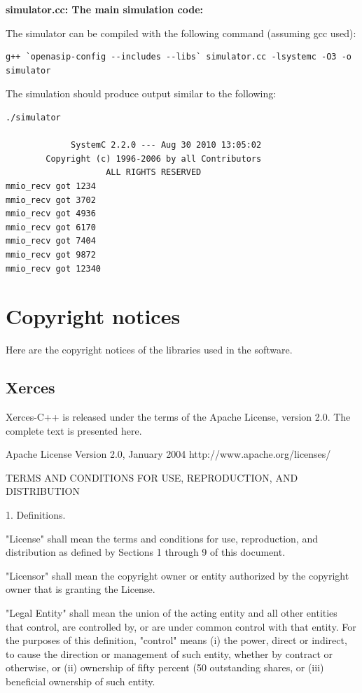 \documentclass[a4paper,twoside]{tceusermanual}
\begin{document}
\textbf{simulator.cc: The main simulation code:}
 


The simulator can be compiled with the following command (assuming gcc
used):

\begin{verbatim}
g++ `openasip-config --includes --libs` simulator.cc -lsystemc -O3 -o simulator
\end{verbatim}

The simulation should produce output similar to the following:

\begin{verbatim}
./simulator

             SystemC 2.2.0 --- Aug 30 2010 13:05:02
        Copyright (c) 1996-2006 by all Contributors
                    ALL RIGHTS RESERVED
mmio_recv got 1234
mmio_recv got 3702
mmio_recv got 4936
mmio_recv got 6170
mmio_recv got 7404
mmio_recv got 9872
mmio_recv got 12340
\end{verbatim}


\chapter{Copyright notices}

Here are the copyright notices of the libraries used in the software.

\section{Xerces}

Xerces-C++ is released under the terms of the Apache License, version
2.0.  The complete text is presented here.


                                 Apache License
                           Version 2.0, January 2004
                        http://www.apache.org/licenses/

   TERMS AND CONDITIONS FOR USE, REPRODUCTION, AND DISTRIBUTION

   1. Definitions.

      "License" shall mean the terms and conditions for use, reproduction,
      and distribution as defined by Sections 1 through 9 of this document.

      "Licensor" shall mean the copyright owner or entity authorized by
      the copyright owner that is granting the License.

      "Legal Entity" shall mean the union of the acting entity and all
      other entities that control, are controlled by, or are under common
      control with that entity. For the purposes of this definition,
      "control" means (i) the power, direct or indirect, to cause the
      direction or management of such entity, whether by contract or
      otherwise, or (ii) ownership of fifty percent (50%
      outstanding shares, or (iii) beneficial ownership of such entity.
\end{document}

